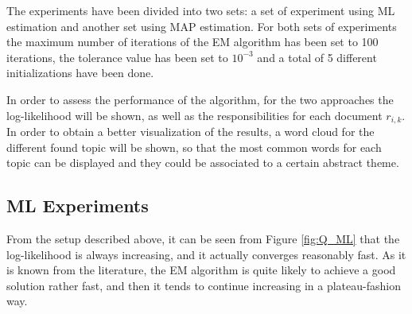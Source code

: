 \documentclass[12pt]{article}
\begin{document}
The experiments have been divided into two sets: a set of experiment using ML estimation and another set using MAP estimation. For both sets of experiments the maximum number of iterations of the EM algorithm has been set to 100 iterations, the tolerance value has been set to $10^{-3}$ and a total of 5 different initializations have been done.

In order to assess the performance of the algorithm, for the two approaches the log-likelihood will be shown, as well as the responsibilities for each document $r_{i,k}$. In order to obtain a better visualization of the results, a word cloud for the different found topic will be shown, so that the most common words for each topic can be displayed and they could be associated to a certain abstract theme. 

\subsection{ML Experiments}

From the setup described above, it can be seen from Figure \ref{fig:Q_ML} that the log-likelihood is always increasing, and it actually converges reasonably fast. As it is known from the literature, the EM algorithm is quite likely to achieve a good solution rather fast, and then it tends to continue increasing in a plateau-fashion way.
\end{document}
